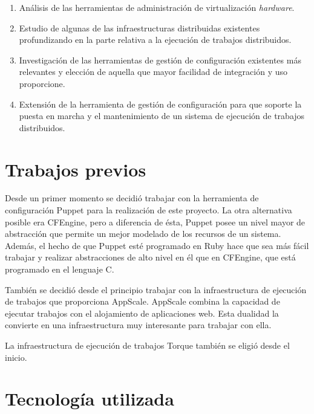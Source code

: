\begin{enumerate}
\item Análisis de las herramientas de administración de virtualización \emph{hardware}.
\item Estudio de algunas de las infraestructuras distribuidas existentes profundizando en la parte relativa a la ejecución de trabajos distribuidos.
\item Investigación de las herramientas de gestión de configuración existentes más relevantes y elección de aquella que mayor facilidad de integración y uso proporcione.
\item Extensión de la herramienta de gestión de configuración para que soporte la puesta en marcha y el mantenimiento de un sistema de ejecución de trabajos distribuidos.
\end{enumerate}


\section{Trabajos previos}

Desde un primer momento se decidió trabajar con la herramienta de configuración Puppet para la realización de este proyecto. La otra alternativa posible era CFEngine, pero a diferencia de ésta, Puppet posee un nivel mayor de abstracción que permite un mejor modelado de los recursos de un sistema. Además, el hecho de que Puppet esté programado en Ruby hace que sea más fácil trabajar y realizar abstracciones de alto nivel en él que en CFEngine, que está programado en el lenguaje C.

También se decidió desde el principio trabajar con la infraestructura de ejecución de trabajos que proporciona AppScale. AppScale combina la capacidad de ejecutar trabajos con el alojamiento de aplicaciones web. Esta dualidad la convierte en una infraestructura muy interesante para trabajar con ella.

La infraestructura de ejecución de trabajos Torque también se eligió desde el inicio.


\section{Tecnología utilizada}

